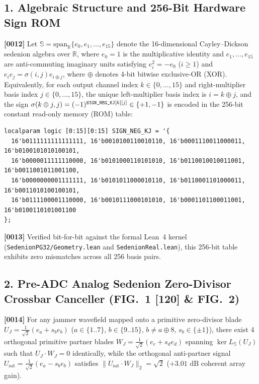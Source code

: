 \documentclass[12pt,letterpaper]{article}
\begin{document}
\subsection*{1. Algebraic Structure and 256-Bit Hardware Sign ROM}
\textbf{[0012]} Let $\mathbb{S} = \mathrm{span}_{\mathbb{R}}\{e_0, e_1, \dots, e_{15}\}$ denote the 16-dimensional Cayley--Dickson sedenion algebra over $\mathbb{R}$, where $e_0 = 1$ is the multiplicative identity and $e_1, \dots, e_{15}$ are anti-commuting imaginary units satisfying $e_i^2 = -e_0$ ($i \ge 1$) and $e_i e_j = \sigma(i, j) e_{i \oplus j}$, where $\oplus$ denotes 4-bit bitwise exclusive-OR (XOR). Equivalently, for each output channel index $k \in \{0,\dots,15\}$ and right-multiplier basis index $j \in \{0,\dots,15\}$, the unique left-multiplier basis index is $i = k \oplus j$, and the sign $\sigma(k \oplus j, j) = (-1)^{\text{\texttt{SIGN\_NEG\_KJ}}[k][j]} \in \{+1, -1\}$ is encoded in the 256-bit constant read-only memory (ROM) table:
{\footnotesize
\begin{verbatim}
localparam logic [0:15][0:15] SIGN_NEG_KJ = '{
  16'b0111111111111111, 16'b0010100110010110, 16'b0001110011000011, 16'b0100101010100101,
  16'b0000011111110000, 16'b0101000110101010, 16'b0110010010011001, 16'b0011001011001100,
  16'b0000000001111111, 16'b0101011000010110, 16'b0110001101000011, 16'b0011010100100101,
  16'b0111100001110000, 16'b0010111000101010, 16'b0001101100011001, 16'b0100110101001100
};
\end{verbatim}
}
\textbf{[0013]} Verified bit-for-bit against the formal Lean~4 kernel (\texttt{SedenionPG32/Geometry.lean} and \texttt{SedenionReal.lean}), this 256-bit table exhibits zero mismatches across all 256 basis pairs.

\subsection*{2. Pre-ADC Analog Sedenion Zero-Divisor Crossbar Canceller (FIG.\ 1 [120] \& FIG.\ 2)}
\textbf{[0014]} For any jammer wavefield mapped onto a primitive zero-divisor blade $U_J = \frac{1}{\sqrt{2}}(e_a + s_b e_b)$ ($a \in \{1..7\},\, b \in \{9..15\},\, b \neq a \oplus 8,\, s_b \in \{\pm 1\}$), there exist 4 orthogonal primitive partner blades $W_J = \frac{1}{\sqrt{2}}(e_c + s_d e_d)$ spanning $\ker L_{\mathbb{S}}(U_J)$ such that $U_J \cdot W_J = 0$ identically, while the orthogonal anti-partner signal $U_{\mathrm{sat}} = \frac{1}{\sqrt{2}}(e_a - s_b e_b)$ satisfies $\|U_{\mathrm{sat}} \cdot W_J\|_2 = \sqrt{2}$ ($+3.01\text{ dB}$ coherent array gain).
\end{document}
